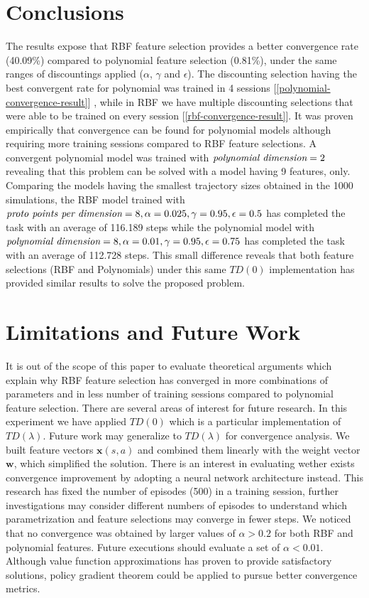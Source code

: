\documentclass[10pt,twocolumn]{article}
\begin{document}
\section{Conclusions}
The results expose that RBF feature selection provides a better convergence rate (40.09\%) compared to polynomial feature selection (0.81\%), under
the same ranges of discountings applied ($\alpha$, $\gamma$ and $\epsilon$). The discounting selection having the best convergent rate for polynomial was trained in 4 sessions [\ref{polynomial-convergence-result}]
, while in RBF we have multiple discounting selections that were able to be trained on every session [\ref{rbf-convergence-result}]. It was proven empirically that convergence can be found for 
polynomial models although requiring more training sessions compared to RBF feature selections. A convergent polynomial model was trained with $\emph{polynomial dimension} = 2$
revealing that this problem can be solved with a model having 9 features, only. Comparing the models having the smallest trajectory sizes obtained in the 1000 simulations,
the RBF model trained with $\emph{proto points per dimension} = 8, \alpha = 0.025, \gamma = 0.95, \epsilon = 0.5 $ has completed the task with an average of 116.189 steps
while the polynomial model with $\emph{polynomial dimension} = 8, \alpha = 0.01, \gamma = 0.95, \epsilon = 0.75 $ has completed the task with an average of 112.728 steps.
This small difference reveals that both feature selections (RBF and Polynomials) under this same $TD(0)$ implementation has provided similar results to solve 
the proposed problem.         

\section{Limitations and Future Work}
It is out of the scope of this paper to evaluate theoretical arguments which explain why RBF feature selection has converged in more combinations of parameters 
and in less number of training sessions compared to polynomial feature selection. There are several areas of interest for future research. 
 In this experiment we have applied $TD(0)$ which is a particular implementation of
$TD(\lambda)$. Future work may generalize to $TD(\lambda)$ for convergence analysis. We built feature vectors $\mathbf{x}(s,a)$ 
and combined them linearly with the weight vector $\mathbf{w}$, which simplified the solution. There is an interest in evaluating wether exists convergence
improvement by adopting a neural network architecture instead. This research has fixed the number of episodes (500) in a training session, further investigations
may consider different numbers of episodes to understand which parametrization and feature selections may converge in fewer steps. We noticed that no convergence
 was obtained by larger values of $\alpha > 0.2$ for both RBF and polynomial features. Future executions should evaluate a set of $\alpha < 0.01$. 
 Although value function approximations has proven to provide satisfactory solutions, policy gradient theorem could be applied to pursue better convergence metrics.
\end{document}
